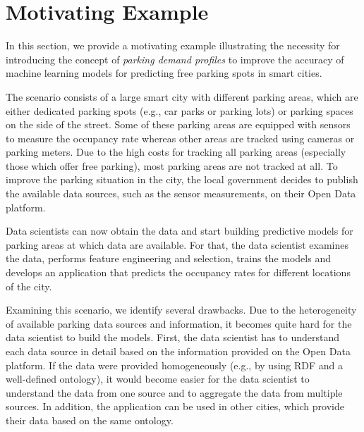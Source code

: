\section{Motivating Example}
In this section, we provide a motivating example illustrating the necessity for introducing the concept of \emph{parking demand profiles} to improve the accuracy of machine learning models for predicting free parking spots in smart cities. 

The scenario consists of a large smart city with different parking areas, which are either dedicated parking spots (e.g., car parks or parking lots) or parking spaces on the side of the street. Some of these parking areas are equipped with sensors to measure the occupancy rate whereas other areas are tracked using cameras or parking meters. Due to the high costs for tracking all parking areas (especially those which offer free parking), most parking areas are not tracked at all. To improve the parking situation in the city, the local government decides to publish the available data sources, such as the sensor measurements, on their Open Data platform. 

Data scientists can now obtain the data and start building predictive models for parking areas at which data are available. For that, the data scientist examines the data, performs feature engineering and selection, trains the models and develops an application that predicts the occupancy rates for different locations of the city. 

Examining this scenario, we identify several drawbacks. Due to the heterogeneity of available parking data sources and information, it becomes quite hard for the data scientist to build the models. 
First, the data scientist has to understand each data source in detail based on the information provided on the Open Data platform. 
If the data were provided homogeneously (e.g., by using RDF and a well-defined ontology), it would become easier for the data scientist to understand the data from one source and to aggregate the data from multiple sources. 
In addition, the application can be used in other cities, which provide their data based on the same ontology.

